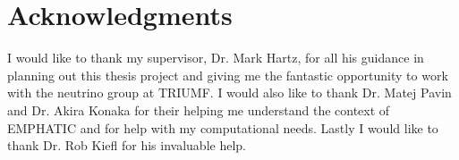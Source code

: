 
\chapter{Acknowledgments}

I would like to thank my supervisor, Dr. Mark Hartz, for all his guidance in planning out this thesis project and giving me the fantastic opportunity to work with the neutrino group at TRIUMF.
I would also like to thank Dr. Matej Pavin and Dr. Akira Konaka for their helping me understand the context of \ac{EMPHATIC} and for help with my computational needs.
Lastly I would like to thank Dr. Rob Kiefl for his invaluable help.